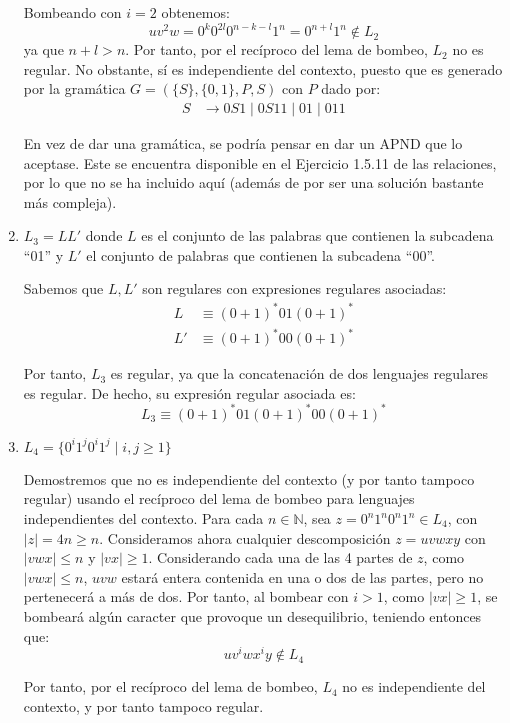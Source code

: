 \documentclass[12pt]{article}
\begin{document}
\begin{ejercicio}[2.5 puntos]
\begin{enumerate}
            Bombeando con $i=2$ obtenemos:
            \begin{equation*}
                uv^2w=0^k0^{2l}0^{n-k-l}1^n=0^{n+l}1^n\notin L_2
            \end{equation*}
            ya que $n+l>n$. Por tanto, por el recíproco del lema de bombeo, $L_2$ no es regular. No obstante, sí es independiente del contexto, puesto que es generado por la gramática $G=(\{S\},\{0,1\},P,S)$ con $P$ dado por:
            \begin{align*}
                S&\to 0S1 \mid 0S11 \mid 01\mid 011
            \end{align*}

            En vez de dar una gramática, se podría pensar en dar un APND que lo aceptase. Este se encuentra disponible en el Ejercicio 1.5.11 de las relaciones, por lo que no se ha incluido aquí (además de por ser una solución bastante más compleja).
            \item $L_3 = LL'$ donde $L$ es el conjunto de las palabras que contienen la subcadena ``01'' y $L'$ el conjunto de palabras
            que contienen la subcadena ``00''.

            Sabemos que $L,L'$ son regulares con expresiones regulares asociadas:
            \begin{align*}
                L&\equiv (0+1)^*01(0+1)^*\\
                L'&\equiv (0+1)^*00(0+1)^*
            \end{align*}

            Por tanto, $L_3$ es regular, ya que la concatenación de dos lenguajes regulares es regular. De hecho, su expresión regular asociada es:
            \begin{equation*}
                L_3\equiv (0+1)^*01(0+1)^*00(0+1)^*
            \end{equation*}
            \item $L_4 = \{0^i 1^j 0^i 1^j \mid i, j \geq 1\}$
            
            Demostremos que no es independiente del contexto (y por tanto tampoco regular) usando el recíproco del lema de bombeo para lenguajes independientes del contexto. Para cada $n\in \mathbb{N}$, sea $z=0^n1^n0^n1^n\in L_4$, con $|z|=4n\geq n$. Consideramos ahora cualquier descomposición $z=uvwxy$ con $|vwx|\leq n$ y $|vx|\geq 1$. Considerando cada una de las 4 partes de $z$, como $|vwx|\leq n$, $uvw$ estará entera contenida en una o dos de las partes, pero no pertenecerá a más de dos. Por tanto, al bombear con $i>1$, como $|vx|\geq 1$, se bombeará algún caracter que provoque un desequilibrio, teniendo entonces que:
            \begin{equation*}
                uv^iwx^iy\notin L_4
            \end{equation*}

            Por tanto, por el recíproco del lema de bombeo, $L_4$ no es independiente del contexto, y por tanto tampoco regular.
        \end{enumerate}
    \end{ejercicio}
\end{document}
